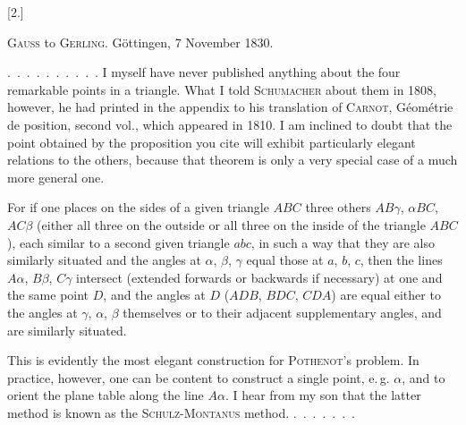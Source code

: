 
\begin{center}
[2.]
\end{center}

\begin{center}
\textsc{Gauss} to \textsc{Gerling}. Göttingen, 7 November 1830.
\end{center}

\indent\mbox{. . . . . . . . . .} I myself have never published anything about
the four remarkable points in a triangle. What I told
\textsc{Schumacher} about them in 1808, however, he had printed in the appendix to his
translation of \textsc{Carnot}, Géométrie de position, second
vol., which appeared in 1810. I am inclined to doubt that
the point obtained by the proposition you cite
will exhibit particularly elegant relations to the others, because
that theorem is only a very special case of a much
more general one.

For if one places on the sides of a given triangle $ABC$
three others $AB\gamma$, $\alpha BC$, $AC\beta$ (either all three
on the outside or all three on the inside of the triangle
$ABC$), each similar to a second given triangle $abc$,
in such a way that they are also similarly situated and the angles at
$\alpha$, $\beta$, $\gamma$ equal those at $a$, $b$, $c$, then
the lines $A\alpha$, $B\beta$, $C\gamma$ intersect
(extended forwards or backwards if necessary) at one and the same point
$D$, and the angles at $D$ ($ADB$, $BDC$, $CDA$) are
equal either to the angles at $\gamma$, $\alpha$, $\beta$ themselves or to their
adjacent supplementary angles, and are similarly situated.

This is evidently the most elegant construction for
\textsc{Pothenot}'s problem. In practice, however, one can be content
to construct a single point, e.\,g. $\alpha$, and to orient the plane table along
the line $A\alpha$. I hear from my son that
the latter method is known as the \textsc{Schulz-Montanus} method. \mbox{. . . . . . .}
